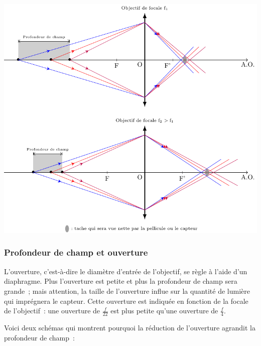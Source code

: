 \documentclass[../../main/main.tex]{subfiles}
\begin{document}
\begin{center}
	\includegraphics[scale=.85]{pfd_chp-foc}
\end{center}


\subsubsection{Profondeur de champ et ouverture}

L'ouverture, c'est-à-dire le diamètre d'entrée de l'objectif, se règle à l'aide
d'un diaphragme. Plus l'ouverture est petite et plus la profondeur de champ sera
grande~; mais attention, la taille de l'ouverture influe sur la quantité de
lumière qui imprégnera le capteur. Cette ouverture est indiquée en fonction de
la focale de l'objectif~: une ouverture de $\frac{f}{22}$ est plus petite qu'une
ouverture de $\frac{f}{4}$.

Voici deux schémas qui montrent pourquoi la réduction de l'ouverture agrandit la
profondeur de champ~:
\end{document}
